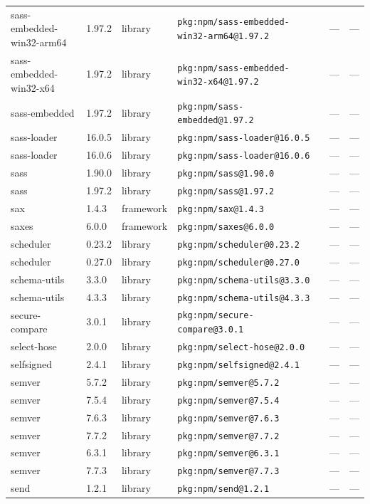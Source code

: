 \documentclass[11pt]{article}
\begin{document}
\begin{longtable}{|l|l|l|p{2.2cm}|l|p{4cm}|}
sass-embedded-win32-arm64 & 1.97.2 & library & \texttt{pkg:npm/sass-embedded-win32-arm64@1.97.2} & — & — \\
sass-embedded-win32-x64 & 1.97.2 & library & \texttt{pkg:npm/sass-embedded-win32-x64@1.97.2} & — & — \\
sass-embedded & 1.97.2 & library & \texttt{pkg:npm/sass-embedded@1.97.2} & — & — \\
sass-loader & 16.0.5 & library & \texttt{pkg:npm/sass-loader@16.0.5} & — & — \\
sass-loader & 16.0.6 & library & \texttt{pkg:npm/sass-loader@16.0.6} & — & — \\
sass & 1.90.0 & library & \texttt{pkg:npm/sass@1.90.0} & — & — \\
sass & 1.97.2 & library & \texttt{pkg:npm/sass@1.97.2} & — & — \\
sax & 1.4.3 & framework & \texttt{pkg:npm/sax@1.4.3} & — & — \\
saxes & 6.0.0 & framework & \texttt{pkg:npm/saxes@6.0.0} & — & — \\
scheduler & 0.23.2 & library & \texttt{pkg:npm/scheduler@0.23.2} & — & — \\
scheduler & 0.27.0 & library & \texttt{pkg:npm/scheduler@0.27.0} & — & — \\
schema-utils & 3.3.0 & library & \texttt{pkg:npm/schema-utils@3.3.0} & — & — \\
schema-utils & 4.3.3 & library & \texttt{pkg:npm/schema-utils@4.3.3} & — & — \\
secure-compare & 3.0.1 & library & \texttt{pkg:npm/secure-compare@3.0.1} & — & — \\
select-hose & 2.0.0 & library & \texttt{pkg:npm/select-hose@2.0.0} & — & — \\
selfsigned & 2.4.1 & library & \texttt{pkg:npm/selfsigned@2.4.1} & — & — \\
semver & 5.7.2 & library & \texttt{pkg:npm/semver@5.7.2} & — & — \\
semver & 7.5.4 & library & \texttt{pkg:npm/semver@7.5.4} & — & — \\
semver & 7.6.3 & library & \texttt{pkg:npm/semver@7.6.3} & — & — \\
semver & 7.7.2 & library & \texttt{pkg:npm/semver@7.7.2} & — & — \\
semver & 6.3.1 & library & \texttt{pkg:npm/semver@6.3.1} & — & — \\
semver & 7.7.3 & library & \texttt{pkg:npm/semver@7.7.3} & — & — \\
send & 1.2.1 & library & \texttt{pkg:npm/send@1.2.1} & — & — \\

\end{longtable}
\end{document}
